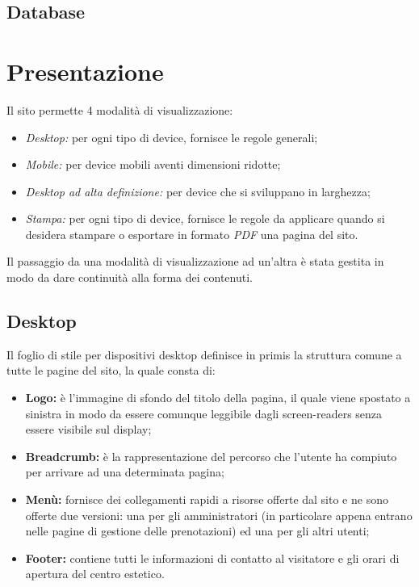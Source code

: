 \documentclass[]{article}
\begin{document}
\subsection{Database}
\label{subsec:database}

\section{Presentazione}
Il sito permette 4 modalità di visualizzazione:
\begin{itemize}
	\item \textit{Desktop:} per ogni tipo di device, fornisce le regole generali;
	\item \textit{Mobile:} per device mobili aventi dimensioni ridotte;
	\item \textit{Desktop ad alta definizione:} per device che si sviluppano in larghezza;
	\item \textit{Stampa:} per ogni tipo di device, fornisce le regole da applicare quando si desidera stampare o esportare in formato \textit{PDF} una pagina del sito.
\end{itemize}
Il passaggio da una modalità di visualizzazione ad un'altra è stata gestita in modo da dare continuità alla forma dei contenuti.

\subsection{Desktop}
Il foglio di stile per dispositivi desktop definisce in primis la struttura comune a tutte le pagine del sito, la quale consta di:
\begin{itemize}
	\item \textbf{Logo:} è l'immagine di sfondo del titolo della pagina, il quale viene spostato a sinistra in modo da essere comunque leggibile dagli screen-readers senza essere visibile sul display;
	\item \textbf{Breadcrumb:} è la rappresentazione del percorso che l'utente ha compiuto per arrivare ad una determinata pagina;
	\item \textbf{Menù:} fornisce dei collegamenti rapidi a risorse offerte dal sito e ne sono offerte due versioni: una per gli amministratori (in particolare appena entrano nelle pagine di gestione delle prenotazioni) ed una per gli altri utenti;
	\item \textbf{Footer:} contiene tutti le informazioni di contatto al visitatore e gli orari di apertura del centro estetico.
\end{itemize}
\end{document}
